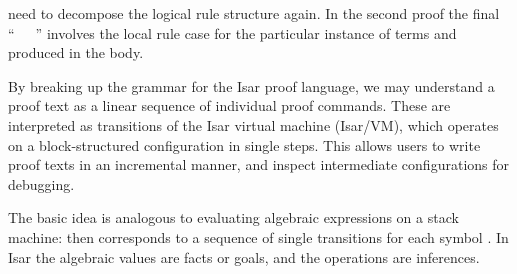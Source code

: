 \begin{isabellebody}
\begin{isamarkuptext}
  need to decompose the logical rule structure again.  In the second
  proof the final ``\hyperlink{command.then}{\mbox{}}~\hyperlink{command.show}{\mbox{}}~~\hyperlink{command.ddot}{\mbox{\isa{\isacommand{{\isachardot}{\isachardot}}}}}''  involves the local rule case  for the particular instance of terms  and  produced in the body.%
\end{isamarkuptext}%
\isamarkuptrue%
%
\isamarkuptrue%
%
\begin{isamarkuptext}%
By breaking up the grammar for the Isar proof language, we may
  understand a proof text as a linear sequence of individual proof
  commands.  These are interpreted as transitions of the Isar virtual
  machine (Isar/VM), which operates on a block-structured
  configuration in single steps.  This allows users to write proof
  texts in an incremental manner, and inspect intermediate
  configurations for debugging.

  The basic idea is analogous to evaluating algebraic expressions on a
  stack machine:  then corresponds to a sequence
  of single transitions for each symbol .
  In Isar the algebraic values are facts or goals, and the operations
  are inferences.


\end{isamarkuptext}
\end{isabellebody}
